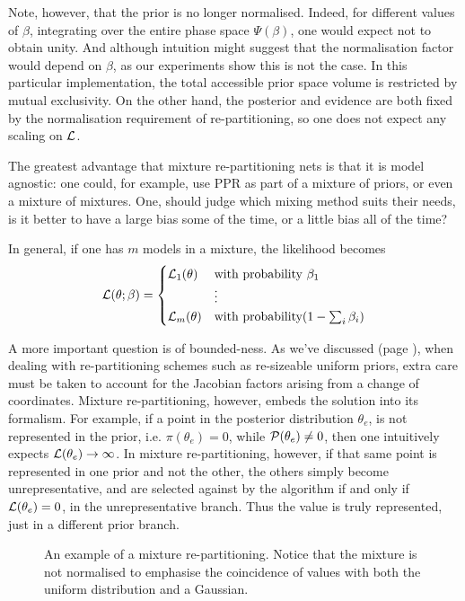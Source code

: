 \documentclass[usenatbib]{mnras}
\begin{document}
Note, however, that the prior is no longer normalised. Indeed, for
different values of \(\beta\), integrating over the entire phase
space \(\Psi(\beta)\), one would expect not to obtain unity. And
although intuition might suggest that the normalisation factor
would depend on \(\beta\), as our experiments show this is not the
case. In this particular implementation, the total accessible
prior space volume is restricted by mutual exclusivity. On the
other hand, the posterior and evidence are both fixed by the
normalisation requirement of re-partitioning, so one does not
expect any scaling on \({\cal L}\). 

The greatest advantage that mixture re-partitioning nets is
that it is model agnostic: one could, for example, use PPR as
part of a mixture of priors, or even a mixture of
mixtures. One, should judge which mixing method suits their
needs, is it better to have a large bias some of the time, or
a little bias all of the time?

In general,  if one has \(m\) models in a mixture, the likelihood becomes 
\begin{equation}
  {\cal L}(\theta; \beta)  = \begin{cases}
	{\cal L}_{1}(\theta) &  \text{with probability } \beta_{1}\\
		    &\vdots\\
	{\cal L}_{m}(\theta) & \text{with probability} (1- \sum_{i}\beta_{i})
	\end{cases}
\end{equation}


A more important question is of bounded-ness. As we've discussed
(page \pageref{domain-discussion}), when dealing with re-partitioning
schemes such as re-sizeable uniform priors, extra care must be
taken to account for the Jacobian factors arising from a change of
coordinates. Mixture re-partitioning, however, embeds the solution
into its formalism. For example, if a point in the posterior
distribution \(\theta_{e}\), is not represented in the prior, i.e.
\(\pi(\theta_{e}) = 0\), while \({\cal P}(\theta_{e}) \ne 0\), then
one intuitively expects \({\cal L}(\theta_{e}) \rightarrow
	\infty\). In mixture re-partitioning, however, if that same point is
represented in one prior and not the other, the others simply
become unrepresentative, and are selected against by the algorithm
if and only if \({\cal L}(\theta_{e}) = 0\), in the unrepresentative
branch. Thus the value is truly represented, just in a different
prior branch.

\begin{figure}
 
\caption{\label{org622f347}
An example of a mixture re-partitioning. Notice that the mixture is not normalised to emphasise the coincidence of values with both the uniform distribution and a Gaussian.}
\end{figure}
\end{document}
